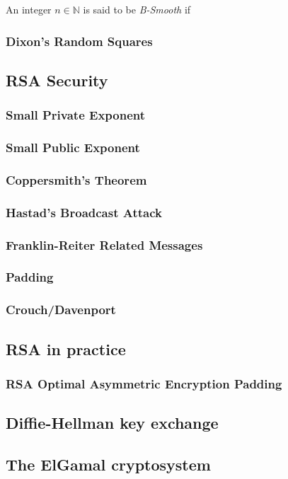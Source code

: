 \begin{definition}
    An integer $n \in \mathbb{N}$ is said to be \textit{B-Smooth} if
\end{definition}

\begin{example}
\end{example}
\subsubsection{Dixon’s Random Squares}

\subsection{RSA Security}
\subsubsection{Small Private Exponent}
\subsubsection{Small Public Exponent}
\subsubsection{Coppersmith’s Theorem}
\subsubsection{Hastad’s Broadcast Attack}
\subsubsection{Franklin-Reiter Related Messages}
\subsubsection{Padding}
\subsubsection{Crouch/Davenport}

\subsection{RSA in practice}
\subsubsection{RSA Optimal Asymmetric Encryption Padding}

\subsection{Diffie-Hellman key exchange}
\subsection{The ElGamal cryptosystem}
